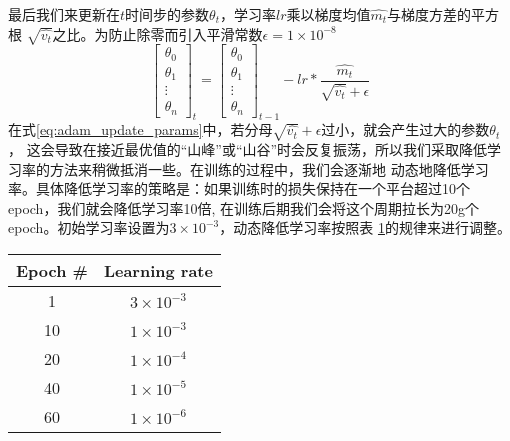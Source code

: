 \noindent{}最后我们来更新在$t$时间步的参数$\theta_{t}$，学习率$lr$乘以梯度均值$\widehat{m_t}$与梯度方差的平方根
$\sqrt{\widehat{v_t}}$之比。为防止除零而引入平滑常数$\epsilon = 1 \times {10}^{-8}$
\begin{equation}\label{eq:adam_update_params}
    \begin{bmatrix}
        \theta_{0} \\
        \theta_{1} \\
        \vdots \\
        \theta_{n}
    \end{bmatrix}_{t} = 
    \begin{bmatrix}
        \theta_{0} \\
        \theta_{1} \\
        \vdots \\
        \theta_{n}
    \end{bmatrix}_{t-1} -
    {lr} * \frac{\widehat{m_t}}{\sqrt{\widehat{v_t}} + \epsilon}
\end{equation}
在式\ref{eq:adam_update_params}中，若分母$\sqrt{\widehat{v_t}}+\epsilon$过小，就会产生过大的参数$\theta_{t}$，
这会导致在接近最优值的“山峰”或“山谷”时会反复振荡，所以我们采取降低学习率的方法来稍微抵消一些。在训练的过程中，我们会逐渐地
动态地降低学习率。具体降低学习率的策略是：如果训练时的损失保持在一个平台超过10个epoch，我们就会降低学习率10倍, 
在训练后期我们会将这个周期拉长为20g个epoch。初始学习率设置为$3 \times {10}^{-3}$，动态降低学习率按照表
\ref{tbl:descend_lr}的规律来进行调整。
\begin{table}[!htp]
    \label{tbl:descend_lr}
    \centering
    \begin{tabular}{cc}
        \toprule
        Epoch \# & Learning rate \\
        \midrule
        1 & $3 \times {10}^{-3}$ \\
        10 & $1 \times {10}^{-3}$ \\
        20 & $1 \times {10}^{-4}$ \\
        40 & $1 \times {10}^{-5}$ \\
        60 & $1 \times {10}^{-6}$ \\
        \bottomrule
    \end{tabular}
\end{table}


